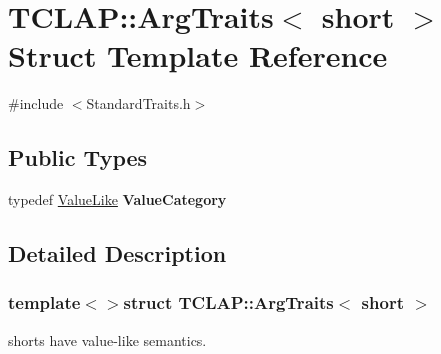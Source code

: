 \hypertarget{struct_t_c_l_a_p_1_1_arg_traits_3_01short_01_4}{\section{T\-C\-L\-A\-P\-:\-:Arg\-Traits$<$ short $>$ Struct Template Reference}
\label{struct_t_c_l_a_p_1_1_arg_traits_3_01short_01_4}
}


{\ttfamily \#include $<$Standard\-Traits.\-h$>$}

\subsection*{Public Types}
\begin{DoxyCompactItemize}
\item 
\hypertarget{struct_t_c_l_a_p_1_1_arg_traits_3_01short_01_4_a99f5d76501b120d6455b528aa7bf6896}{typedef \hyperlink{struct_t_c_l_a_p_1_1_value_like}{Value\-Like} {\bfseries Value\-Category}}\label{struct_t_c_l_a_p_1_1_arg_traits_3_01short_01_4_a99f5d76501b120d6455b528aa7bf6896}

\end{DoxyCompactItemize}


\subsection{Detailed Description}
\subsubsection*{template$<$$>$struct T\-C\-L\-A\-P\-::\-Arg\-Traits$<$ short $>$}

shorts have value-\/like semantics. 